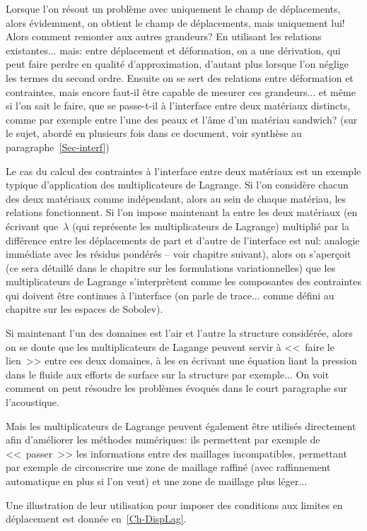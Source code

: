Lorsque l'on résout un problème avec uniquement le champ de déplacements,
alors évidemment, on obtient le champ de déplacements, mais uniquement lui!
Alors comment remonter aux autres grandeurs? En utilisant les relations
existantes... mais: entre déplacement et déformation, on a une dérivation,
qui peut faire perdre en qualité d'approximation, d'autant plus lorsque l'on
néglige les termes du second ordre.
Ensuite on se sert des relations entre déformation et contraintes, mais encore
faut-il être capable de mesurer ces grandeurs... et même si l'on sait le faire,
que se passe-t-il à l'interface entre deux matériaux distincts, comme par exemple
entre l'une des peaux et l'âme d'un matériau sandwich? (sur le sujet, abordé en
plusieurs fois dans ce document, voir synthèse au paragraphe~\ref{Sec-interf})

\medskip
Le cas du calcul des contraintes à l'interface entre deux matériaux est un exemple
typique d'application des multiplicateurs de Lagrange.
Si l'on considère chacun des deux matériaux comme indépendant, alors au sein
de chaque matériau, les relations fonctionnent.
Si l'on impose maintenant la  
entre les deux matériaux (en écrivant que~$\lambda$ (qui représente les multiplicateurs de Lagrange)
multiplié par la différence entre les déplacements de part et d'autre de l'interface est nul: analogie
immédiate avec les résidus pondérés -- voir chapitre suivant), 
alors on s'aperçoit (ce sera détaillé dans le chapitre sur les 
formulations variationnelles) que les multiplicateurs de Lagrange s'interprètent comme
les composantes des contraintes qui doivent être continues à l'interface (on parle
de trace... comme défini au chapitre sur les espaces de Sobolev).

\medskip
Si maintenant l'un des domaines est l'air et l'autre la structure considérée, alors
on se doute que les multiplicateurs de Lagange peuvent servir à <<~faire le lien~>> 
entre ces deux domaines, à les  en écrivant une équation
liant la pression dans le fluide aux efforts de surface sur la structure par exemple...
On voit comment on peut résoudre les problèmes évoqués dans le court paragraphe 
sur l'acoustique.

\medskip
Mais les multiplicateurs de Lagrange peuvent également être utilisés directement
afin d'améliorer les méthodes numériques: ils permettent par exemple de <<~passer~>>
les informations entre des maillages incompatibles, permettant par exemple de circonscrire
une zone de maillage raffiné (avec raffinnement automatique en plus si l'on veut) et une
zone de maillage plus léger...

Une illustration de leur utilisation pour imposer des conditions aux limites en déplacement
est donnée en~\ref{Ch-DispLag}.

\medskip
{}




